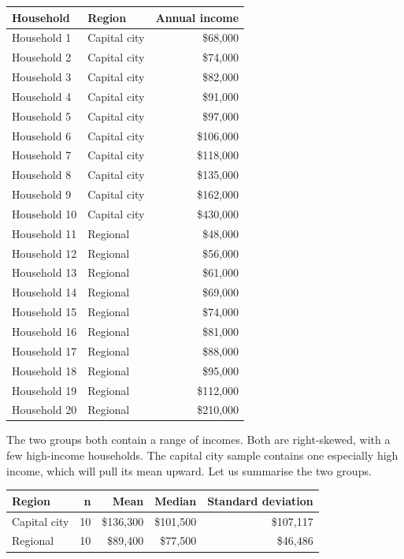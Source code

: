 \documentclass[
  letterpaper,
  DIV=11,
  numbers=noendperiod]{scrreprt}
\begin{document}
\begin{table}
\fontsize{12.0pt}{14.0pt}\selectfont
\begin{tabular*}{\linewidth}{@{\extracolsep{\fill}}llr}
\toprule
Household & Region & Annual income \\ 
\midrule\addlinespace[2.5pt]
Household 1 & Capital city & \$68,000 \\ 
Household 2 & Capital city & \$74,000 \\ 
Household 3 & Capital city & \$82,000 \\ 
Household 4 & Capital city & \$91,000 \\ 
Household 5 & Capital city & \$97,000 \\ 
Household 6 & Capital city & \$106,000 \\ 
Household 7 & Capital city & \$118,000 \\ 
Household 8 & Capital city & \$135,000 \\ 
Household 9 & Capital city & \$162,000 \\ 
Household 10 & Capital city & \$430,000 \\ 
Household 11 & Regional & \$48,000 \\ 
Household 12 & Regional & \$56,000 \\ 
Household 13 & Regional & \$61,000 \\ 
Household 14 & Regional & \$69,000 \\ 
Household 15 & Regional & \$74,000 \\ 
Household 16 & Regional & \$81,000 \\ 
Household 17 & Regional & \$88,000 \\ 
Household 18 & Regional & \$95,000 \\ 
Household 19 & Regional & \$112,000 \\ 
Household 20 & Regional & \$210,000 \\ 
\bottomrule
\end{tabular*}
\end{table}

The two groups both contain a range of incomes. Both are right-skewed,
with a few high-income households. The capital city sample contains one
especially high income, which will pull its mean upward. Let us
summarise the two groups.

\begin{table}
\fontsize{12.0pt}{14.0pt}\selectfont
\begin{tabular*}{\linewidth}{@{\extracolsep{\fill}}lrrrr}
\toprule
Region & n & Mean & Median & Standard deviation \\ 
\midrule\addlinespace[2.5pt]
Capital city & 10 & \$136,300 & \$101,500 & \$107,117 \\ 
Regional & 10 & \$89,400 & \$77,500 & \$46,486 \\ 
\bottomrule
\end{tabular*}
\end{table}
\end{document}
